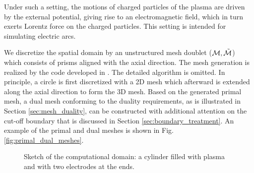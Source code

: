 \documentclass{article}
\newcommand{\todo}[1]{\textcolor{blue}{\fbox{\textbf{TODO: #1}}}}
\begin{document}
Under such a setting, the motions of charged particles of the plasma are driven by the external potential, giving rise to an electromagnetic field, which in turn exerts Lorentz force on the charged particles. This setting is intended for simulating electric arcs.

We discretize the spatial domain by an unstructured mesh doublet ($\mathcal{M}, \Tilde{\mathcal{M}}$) which consists of prisms aligned with the axial direction. The mesh generation is realized by the code developed in \cite{fuchs_2021}. The detailed algorithm is omitted. In principle, a circle is first discretized with a 2D mesh which afterward is extended along the axial direction to form the 3D mesh. Based on the generated primal mesh, a dual mesh conforming to the duality requirements, as is illustrated in Section \ref{sec:mesh_duality}, can be constructed with additional attention on the cut-off boundary that is discussed in Section \ref{sec:boundary_treatment}. An example of the primal and dual meshes is shown in Fig. \ref{fig:primal_dual_meshes}.

\begin{figure}
    \centering
    \caption{Sketch of the computational domain: a cylinder filled with plasma and with two electrodes at the ends.\todo{Change the figure}}
    \label{fig:sketch_domain}
\end{figure}
\end{document}
